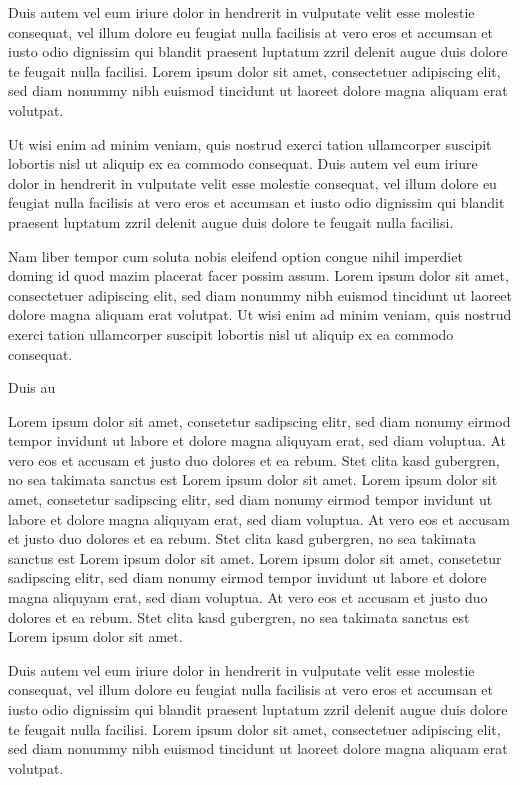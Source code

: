 \documentclass{article}
\begin{document}
Duis autem vel eum iriure dolor in hendrerit in vulputate velit esse molestie consequat, vel illum dolore eu feugiat
nulla facilisis at vero eros et accumsan et iusto odio dignissim qui blandit praesent luptatum zzril delenit augue
duis dolore te feugait nulla facilisi. Lorem ipsum dolor sit amet, consectetuer adipiscing elit, sed diam nonummy
nibh euismod tincidunt ut laoreet dolore magna aliquam erat volutpat.

Ut wisi enim ad minim veniam, quis nostrud exerci tation ullamcorper suscipit lobortis nisl ut aliquip ex ea commodo
consequat. Duis autem vel eum iriure dolor in hendrerit in vulputate velit esse molestie consequat, vel illum dolore
eu feugiat nulla facilisis at vero eros et accumsan et iusto odio dignissim qui blandit praesent luptatum zzril
delenit augue duis dolore te feugait nulla facilisi.

Nam liber tempor cum soluta nobis eleifend option congue nihil imperdiet doming id quod mazim placerat facer possim
assum. Lorem ipsum dolor sit amet, consectetuer adipiscing elit, sed diam nonummy nibh euismod tincidunt ut laoreet
dolore magna aliquam erat volutpat. Ut wisi enim ad minim veniam, quis nostrud exerci tation ullamcorper suscipit
lobortis nisl ut aliquip ex ea commodo consequat.

Duis au



Lorem ipsum dolor sit amet, consetetur sadipscing elitr, sed diam nonumy eirmod tempor invidunt ut labore et dolore
magna aliquyam erat, sed diam voluptua. At vero eos et accusam et justo duo dolores et ea rebum. Stet clita kasd
gubergren, no sea takimata sanctus est Lorem ipsum dolor sit amet. Lorem ipsum dolor sit amet, consetetur sadipscing
elitr, sed diam nonumy eirmod tempor invidunt ut labore et dolore magna aliquyam erat, sed diam voluptua. At vero eos
et accusam et justo duo dolores et ea rebum. Stet clita kasd gubergren, no sea takimata sanctus est Lorem ipsum dolor
sit amet. Lorem ipsum dolor sit amet, consetetur sadipscing elitr, sed diam nonumy eirmod tempor invidunt ut labore
et dolore magna aliquyam erat, sed diam voluptua. At vero eos et accusam et justo duo dolores et ea rebum. Stet clita
kasd gubergren, no sea takimata sanctus est Lorem ipsum dolor sit amet.

Duis autem vel eum iriure dolor in hendrerit in vulputate velit esse molestie consequat, vel illum dolore eu feugiat
nulla facilisis at vero eros et accumsan et iusto odio dignissim qui blandit praesent luptatum zzril delenit augue
duis dolore te feugait nulla facilisi. Lorem ipsum dolor sit amet, consectetuer adipiscing elit, sed diam nonummy
nibh euismod tincidunt ut laoreet dolore magna aliquam erat volutpat.
\end{document}
